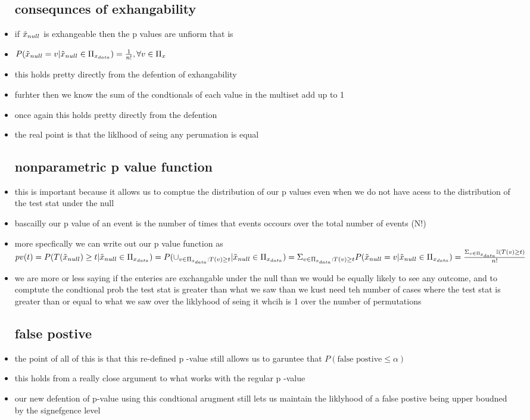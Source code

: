 \documentclass{article}
\begin{document}
\begin{itemize}
\subsection{consequnces of exhangability}
\item if $\Tilde{x}_{null}$ is exhangeable then the p values are unfiorm that is 
\item $P(\Tilde{x}_{null}=v|\Tilde{x}_{null}\in \Pi_{x_{data}})=\frac{1}{n!}, \forall v \in \Pi_{x} $
\item this holds pretty directly from the defention of exhangability
\item furhter then we know the sum of the condtionals of each value in the multiset  add up to 1 
\item once again this holds pretty directly from the defention
\item the real point is that the liklhood of seing any perumation is equal 

\subsection{nonparametric p value function}
\item this is important because it allows us to comptue the distribution of our p values even when we do not have acess to the distribution of the test stat under the null 
\item bascailly our p value of an event is the number of times that events occours over the total number of events (N!)
\item more specfically we can write out our p value function as  $pv(t)=P(T(\Tilde{x}_{null})\geq t|\Tilde{x}_{null} \in \Pi_{x_{data}})=P(\cup_{v\in \Pi_{x_{data}}:T(v)\geq t}|\Tilde{x}_{null} \in \Pi_{x_{data}})=
\Sigma_{v\in \Pi_{x_{data}}:T(v)\geq t}P(\Tilde{x}_{null}=v|\Tilde{x}_{null} \in \Pi_{x_{data}})=\frac{\Sigma_{v\in \Pi_{x_{data}}} \mathbb{I}(T(v)\geq t)}{n!}$
\item we are more or less saying if the enteries are exchangable under the null than we would be equally likely to see any outcome, and to comptute the condtional prob the test stat is greater than what we saw than we kust need teh number of cases where the test stat is greater than or equal to what we saw over the liklyhood of seing it whcih is 1 over the number of permutations
\subsection{false postive} 
\item the point of all of this is that this re-defined p -value still allows us to garuntee that $P(\text{false postive}\leq \alpha)$
\item this holds from a really close argument to what works with the regular p -value
\item our new defention of p-value using this condtional arugment still lets us maintain the liklyhood of a false postive being upper boudned by the signefgence level

\end{itemize}
\end{document}
